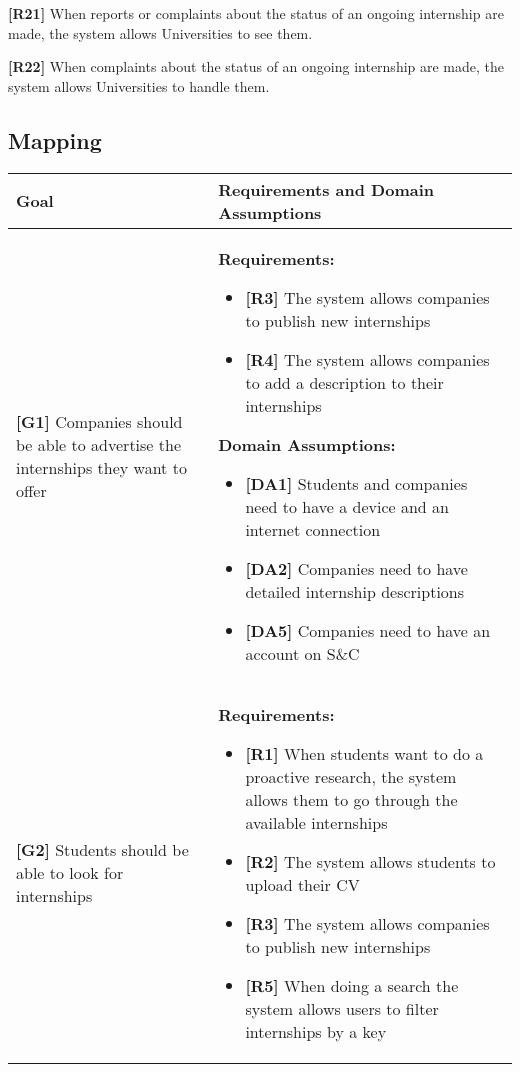 \textbf{[R21]} When reports or complaints about the status of an ongoing internship are made, the system allows Universities to see them.

\textbf{[R22]} When complaints about the status of an ongoing internship are made, the system allows Universities to handle them.



\subsection{Mapping}



\begin{longtable}{|p{}|p{}|}
\hline
\textbf{Goal} & \textbf{Requirements and Domain Assumptions} \\
\hline
\textbf{[G1]} Companies should be able to advertise the internships they want to offer 
& 
\textbf{Requirements:}
\begin{itemize}
    \item \textbf{[R3]} The system allows companies to publish new internships
    \item \textbf{[R4]} The system allows companies to add a description to their internships
\end{itemize}
\textbf{Domain Assumptions:}
\begin{itemize}
    \item \textbf{[DA1]} Students and companies need to have a device and an internet connection
    \item \textbf{[DA2]} Companies need to have detailed internship descriptions
    \item \textbf{[DA5]} Companies need to have an account on S\&C
\end{itemize} \\
\hline
\textbf{[G2]} Students should be able to look for internships 
& 
\textbf{Requirements:}
\begin{itemize}
    \item \textbf{[R1]} When students want to do a proactive research, the system allows them to go through the available internships
    \item \textbf{[R2]} The system allows students to upload their CV
    \item \textbf{[R3]} The system allows companies to publish new internships
    \item \textbf{[R5]} When doing a search the system allows users to filter internships by a key
\end{itemize}

\end{longtable}

